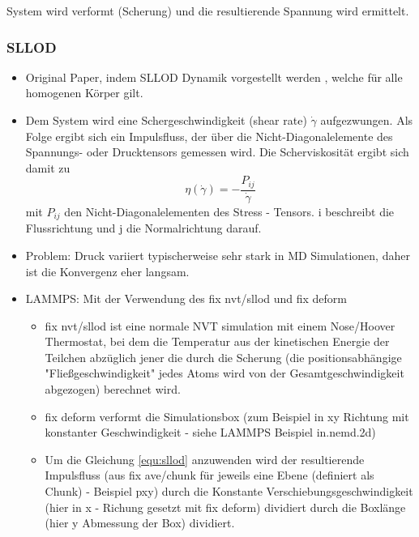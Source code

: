 \documentclass[a4paper, 10pt, 
               numbers=noenddot, toc=graduated,
               headsepline=true, footsepline=true,
               twoside=false, titlepage=true, 
               bibliography=totoc]{scrartcl}
\begin{document}
System wird verformt (Scherung) und die resultierende Spannung wird ermittelt. 


	\subsubsection{SLLOD}
		\begin{itemize}
		 	\item Original Paper, indem SLLOD Dynamik vorgestellt werden \cite{Evans1984}, welche für alle homogenen Körper gilt.
		 	\item Dem System wird eine Schergeschwindigkeit (shear rate) $\dot{\gamma}$ aufgezwungen. Als Folge ergibt sich ein Impulsfluss, der über die Nicht-Diagonalelemente des Spannungs- oder Drucktensors gemessen wird\cite{Tenney2010}. Die Scherviskosität ergibt sich damit zu 
				\begin{equation}
					\eta\left(\dot{\gamma}\right) = - \frac{P_{ij}}{\dot{\gamma}}
					\label{equ:sllod}
				\end{equation}
 mit $P_{ij}$ den Nicht-Diagonalelementen des Stress - Tensors. i beschreibt die Flussrichtung und j die Normalrichtung darauf. 
		 	\item Problem: Druck variiert typischerweise sehr stark in MD Simulationen, daher ist die Konvergenz eher langsam\cite{Tenney2010}.
		 	\item LAMMPS: Mit der Verwendung des fix nvt/sllod und fix deform 
				\begin{itemize}
					\item fix nvt/sllod ist eine normale NVT simulation mit einem Nose/Hoover Thermostat, bei dem die Temperatur aus der kinetischen Energie der Teilchen abzüglich jener die durch die Scherung (die positionsabhängige "Fließgeschwindigkeit" jedes Atoms wird von der Gesamtgeschwindigkeit abgezogen) berechnet wird.
					\item fix deform verformt die Simulationsbox (zum Beispiel in xy Richtung mit konstanter Geschwindigkeit - siehe LAMMPS Beispiel in.nemd.2d)
					\item Um die Gleichung \ref{equ:sllod} anzuwenden wird der resultierende Impulsfluss (aus fix ave/chunk für jeweils eine Ebene (definiert als Chunk) - Beispiel pxy) durch die Konstante Verschiebungsgeschwindigkeit (hier in x - Richung gesetzt mit fix deform) dividiert durch die Boxlänge (hier y Abmessung der Box) dividiert. 
				\end{itemize}
		\end{itemize}
		
\end{document}
